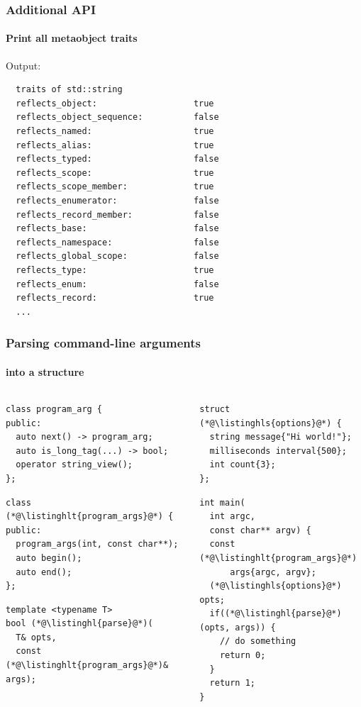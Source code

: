 \documentclass[aspectratio=169,compress,table,xcolor=table]{beamer}
\begin{document}
\begin{frame}[fragile]
  \frametitle{Additional API}
  \framesubtitle{Print all metaobject traits}
  Output:
  \footnotesize
  \begin{verbatim}
  traits of std::string
  reflects_object:                   true
  reflects_object_sequence:          false
  reflects_named:                    true
  reflects_alias:                    true
  reflects_typed:                    false
  reflects_scope:                    true
  reflects_scope_member:             true
  reflects_enumerator:               false
  reflects_record_member:            false
  reflects_base:                     false
  reflects_namespace:                false
  reflects_global_scope:             false
  reflects_type:                     true
  reflects_enum:                     false
  reflects_record:                   true
  ...
  \end{verbatim}
\end{frame}
\begin{frame}[fragile]
  \frametitle{Parsing command-line arguments}
  \framesubtitle{into a structure}
  \begin{columns}
    \begin{column}{.57\textwidth}
      \begin{lstlisting}[language=c++2x,basicstyle=\scriptsize\ttfamily]
class program_arg {
public:
  auto next() -> program_arg;
  auto is_long_tag(...) -> bool;
  operator string_view();
};
      \end{lstlisting}
      \vfill
      \begin{lstlisting}[language=c++2x,basicstyle=\scriptsize\ttfamily]
class (*@\listinghlt{program_args}@*) {
public:
  program_args(int, const char**);
  auto begin();
  auto end();
};
      \end{lstlisting}
      \vfill
      \begin{lstlisting}[language=c++2x,basicstyle=\scriptsize\ttfamily]
template <typename T>
bool (*@\listinghl{parse}@*)(
  T& opts,
  const (*@\listinghlt{program_args}@*)& args);
      \end{lstlisting}
    \end{column}
    \begin{column}{.44\textwidth}
      \begin{lstlisting}[language=c++2x,basicstyle=\scriptsize\ttfamily]
struct (*@\listinghls{options}@*) {
  string message{"Hi world!"};
  milliseconds interval{500};
  int count{3};
};
      \end{lstlisting}
      \vfill
      \begin{lstlisting}[language=c++2x,basicstyle=\scriptsize\ttfamily]
int main(
  int argc,
  const char** argv) {
  const (*@\listinghlt{program_args}@*)
      args{argc, argv};
  (*@\listinghls{options}@*) opts;
  if((*@\listinghl{parse}@*)(opts, args)) {
    // do something
    return 0;
  }
  return 1;
}
      \end{lstlisting}
    \end{column}
  \end{columns}
\end{frame}
\end{document}
